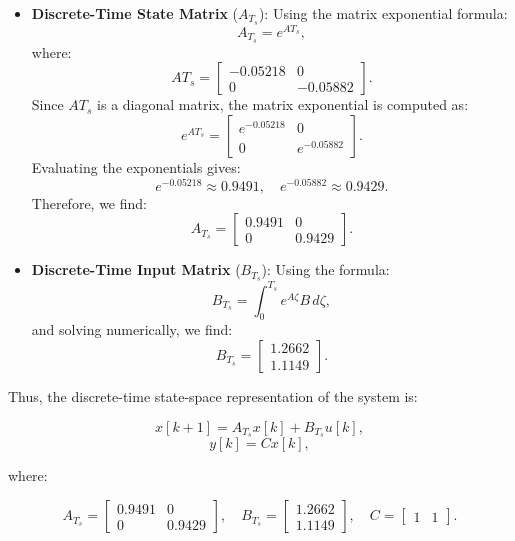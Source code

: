 \begin{itemize}
    \item \textbf{Discrete-Time State Matrix} (\(A_{T_s}\)): 
   Using the matrix exponential formula:
   \[
   A_{T_s} = e^{A T_s},
   \]
   where:
   \[
   A T_s = 
   \begin{bmatrix}
   -0.05218 & 0 \\
   0 & -0.05882
   \end{bmatrix}.
   \]
   Since \( A T_s \) is a diagonal matrix, the matrix exponential is computed as:
   \[
   e^{A T_s} = 
   \begin{bmatrix}
   e^{-0.05218} & 0 \\
   0 & e^{-0.05882}
   \end{bmatrix}.
   \]
   Evaluating the exponentials gives:
   \[
   e^{-0.05218} \approx 0.9491, \quad e^{-0.05882} \approx 0.9429.
   \]
   Therefore, we find:
   \[
   A_{T_s} = 
   \begin{bmatrix}
   0.9491 & 0 \\
   0 & 0.9429
   \end{bmatrix}.
   \]
\end{itemize}

\begin{itemize} 
    \item \textbf{Discrete-Time Input Matrix} (\(B_{T_s}\)): 
   Using the formula:
   \[
   B_{T_s} = \int_0^{T_s} e^{A \zeta} B \, d\zeta,
   \]
   and solving numerically, we find:
   \[
   B_{T_s} = 
   \begin{bmatrix}
   1.2662 \\
   1.1149
   \end{bmatrix}.
   \]
\end{itemize}

Thus, the discrete-time state-space representation of the system is:

\[
x[k+1] = A_{T_s} x[k] + B_{T_s} u[k],
\]
\[
y[k] = C x[k],
\]

where:

\[
A_{T_s} = 
\begin{bmatrix}
0.9491 & 0 \\
0 & 0.9429
\end{bmatrix}, \quad
B_{T_s} = 
\begin{bmatrix}
1.2662 \\
1.1149
\end{bmatrix}, \quad
C = 
\begin{bmatrix}
1 & 1
\end{bmatrix}.
\]

